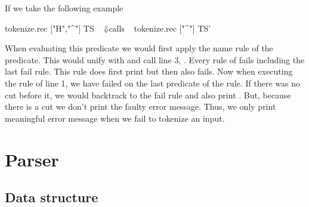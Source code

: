 \documentclass[thesis.tex]{subfiles}
\begin{document}
{{If we take the following example
\begin{elpicode}
  tokenize.rec ["H","^"] TS
              ~$\Downarrow \text{calls}$~ 
  tokenize.rec ["^"] TS'
\end{elpicode}
When evaluating this predicate we would first apply the name rule of the  predicate. This would unify  with \elpii{[tName "H" | TS']} and call line 3, . Every rule of  fails including the last fail rule. This rule does first print  but then also fails. Now when executing the rule of line 1, we have failed on the last predicate of the rule. If there was no cut before it, we would backtrack to the fail rule and also print . But, because there is a cut we don't print the faulty error message. Thus, we only print meaningful error message when we fail to tokenize an input.

\section{Parser}\label{ssec:parser}

\subsection{Data structure}

}}
\end{document}
